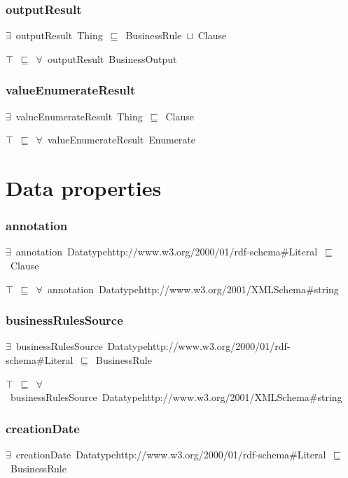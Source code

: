 \documentclass{article}
\begin{document}
\subsubsection*{outputResult}

\ensuremath{\exists}~outputResult~Thing~\ensuremath{\sqsubseteq}~BusinessRule~\ensuremath{\sqcup}~Clause

\ensuremath{\top}~\ensuremath{\sqsubseteq}~\ensuremath{\forall}~outputResult~BusinessOutput

\subsubsection*{valueEnumerateResult}

\ensuremath{\exists}~valueEnumerateResult~Thing~\ensuremath{\sqsubseteq}~Clause

\ensuremath{\top}~\ensuremath{\sqsubseteq}~\ensuremath{\forall}~valueEnumerateResult~Enumerate

\section*{Data properties}\subsubsection*{annotation}

\ensuremath{\exists}~annotation~Datatypehttp://www.w3.org/2000/01/rdf-schema#Literal~\ensuremath{\sqsubseteq}~Clause

\ensuremath{\top}~\ensuremath{\sqsubseteq}~\ensuremath{\forall}~annotation~Datatypehttp://www.w3.org/2001/XMLSchema#string

\subsubsection*{businessRulesSource}

\ensuremath{\exists}~businessRulesSource~Datatypehttp://www.w3.org/2000/01/rdf-schema#Literal~\ensuremath{\sqsubseteq}~BusinessRule

\ensuremath{\top}~\ensuremath{\sqsubseteq}~\ensuremath{\forall}~businessRulesSource~Datatypehttp://www.w3.org/2001/XMLSchema#string

\subsubsection*{creationDate}

\ensuremath{\exists}~creationDate~Datatypehttp://www.w3.org/2000/01/rdf-schema#Literal~\ensuremath{\sqsubseteq}~BusinessRule
\end{document}
